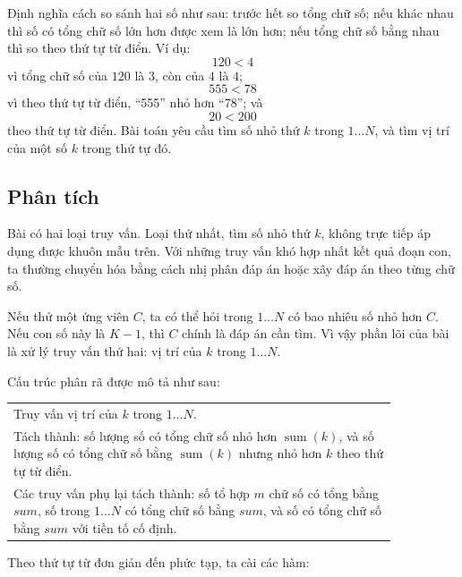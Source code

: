 \documentclass[11pt]{article}
\begin{document}
Định nghĩa cách so sánh hai số như sau: trước hết so tổng chữ số; nếu khác
nhau thì số có tổng chữ số lớn hơn được xem là lớn hơn; nếu tổng chữ số bằng
nhau thì so theo thứ tự từ điển. Ví dụ:
\[
  120 < 4
\]
vì tổng chữ số của \(120\) là \(3\), còn của \(4\) là \(4\);
\[
  555 < 78
\]
vì theo thứ tự từ điển, ``555'' nhỏ hơn ``78''; và
\[
  20 < 200
\]
theo thứ tự từ điển. Bài toán yêu cầu tìm số nhỏ thứ \(k\) trong \(1\ldots N\),
và tìm vị trí của một số \(k\) trong thứ tự đó.

\subsection*{Phân tích}

Bài có hai loại truy vấn. Loại thứ nhất, tìm số nhỏ thứ \(k\), không trực tiếp
áp dụng được khuôn mẫu trên. Với những truy vấn khó hợp nhất kết quả đoạn con,
ta thường chuyển hóa bằng cách nhị phân đáp án hoặc xây đáp án theo từng chữ
số.

Nếu thử một ứng viên \(C\), ta có thể hỏi trong \(1\ldots N\) có bao nhiêu số
nhỏ hơn \(C\). Nếu con số này là \(K-1\), thì \(C\) chính là đáp án cần tìm.
Vì vậy phần lõi của bài là xử lý truy vấn thứ hai: vị trí của \(k\) trong
\(1\ldots N\).

Cấu trúc phân rã được mô tả như sau:

\begin{center}
\begin{tabular}{p{0.85\linewidth}}
Truy vấn vị trí của \(k\) trong \(1\ldots N\).\\[0.2em]
\quad Tách thành: số lượng số có tổng chữ số nhỏ hơn \(\operatorname{sum}(k)\),
và số lượng số có tổng chữ số bằng \(\operatorname{sum}(k)\) nhưng nhỏ hơn
\(k\) theo thứ tự từ điển.\\[0.2em]
\quad Các truy vấn phụ lại tách thành: số tổ hợp \(m\) chữ số có tổng bằng
\(\mathit{sum}\), số trong \(1\ldots N\) có tổng chữ số bằng \(\mathit{sum}\),
và số có tổng chữ số bằng \(\mathit{sum}\) với tiền tố cố định.
\end{tabular}
\end{center}

Theo thứ tự từ đơn giản đến phức tạp, ta cài các hàm:
\end{document}
